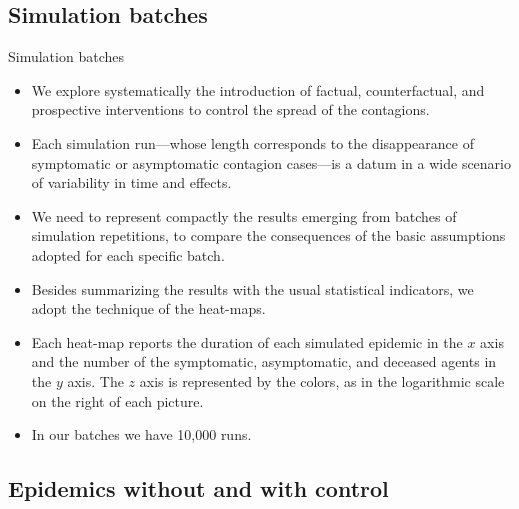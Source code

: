 \documentclass[8pt]{beamer}
\begin{document}
\subsection{Simulation batches}

\begin{frame}{Simulation batches}

  \begin{itemize}
  \item

We explore systematically the introduction of factual, counterfactual, and prospective interventions to control the spread of the contagions. 

  \item
Each simulation run---whose length corresponds to the disappearance of symptomatic or asymptomatic contagion cases---is a datum in a wide scenario of variability in time and effects.   
  
  \item
We need to represent compactly the results  emerging from batches of simulation repetitions, to compare the  consequences of the basic assumptions adopted for each specific batch.

 \item
Besides summarizing the results with the usual statistical indicators, we adopt the technique of the heat-maps.

\item
Each heat-map reports the duration of each simulated epidemic in the $x$ axis and the number of the symptomatic, asymptomatic, and deceased agents in the $y$ axis. The $z$ axis is represented by the colors, as in the logarithmic scale on the right of each picture. 

\item
In our batches we have 10,000 runs.

\end{itemize}
\end{frame}

\subsection{Epidemics without and with control}
\end{document}
